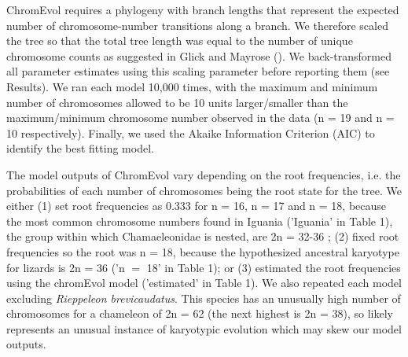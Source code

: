 \documentclass[a4paper, 12pt]{article}
\begin{document}
ChromEvol requires a phylogeny with branch lengths that represent the expected number of chromosome-number transitions along a branch. We therefore scaled the tree so that the total tree length was equal to the number of unique chromosome counts as suggested in Glick and Mayrose (\citeyear{glick2014chromevol}). 
We back-transformed all parameter estimates using this scaling parameter before reporting them (see Results). 
We ran each model 10,000 times, with the maximum and minimum number of chromosomes allowed to be 10 units larger/smaller than the maximum/minimum chromosome number observed in the data (n = 19 and n = 10 respectively). 
Finally, we used the Akaike Information Criterion (AIC) to identify the best fitting model. 

The model outputs of ChromEvol vary depending on the root frequencies, i.e. the probabilities of each number of chromosomes being the root state for the tree. 
We either (1) set root frequencies as 0.333 for n = 16, n = 17 and n = 18, because the most common chromosome numbers found in Iguania ('Iguania' in Table 1), the group within which Chamaeleonidae is nested, are 2n = 32-36 \citep{olmo2005chromorep}; (2) fixed root frequencies so the root was n = 18, because the hypothesized ancestral karyotype for lizards is 2n = 36 \citep{deakin2016anchoring,lisachov2021whole,mezzasalma2021lizards} ('n $=$ 18' in Table 1); or (3) estimated the root frequencies using the chromEvol model ('estimated' in Table 1). 
We also repeated each model excluding \textit{Rieppeleon brevicaudatus}. 
This species has an unusually high number of chromosomes for a chameleon of 2n = 62 (the next highest is 2n = 38), so likely represents an unusual instance of karyotypic evolution which may skew our model outputs. 
\end{document}

